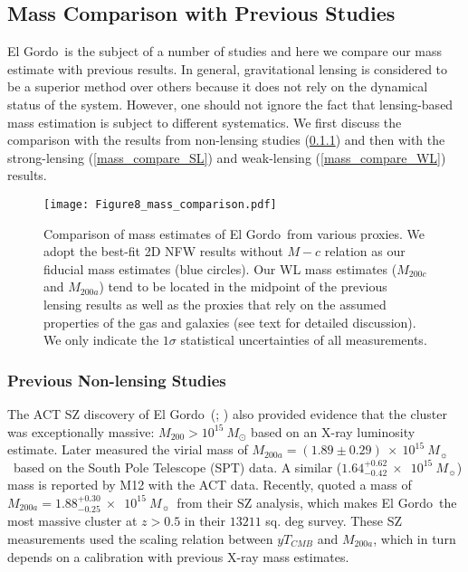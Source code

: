 \documentclass[twocolumn]{aastex631}
\newcommand{\elgordo}{El Gordo}
\newcommand{\solarmA}{$10^{15}~M_{\sun}$}
\begin{document}
\subsection{Mass Comparison with Previous Studies}
\elgordo~is the subject of a number of studies and here we compare our mass estimate with previous results. 
In general, gravitational lensing is considered to be a superior method over others because it does not rely on the dynamical status of the system. 
However, one should not ignore the fact that lensing-based mass estimation is subject to different systematics. 
We first discuss the comparison with the results from non-lensing studies (\textsection\ref{mass_comparison_non_lensing}) and then with the strong-lensing (\textsection\ref{mass_compare_SL}) and weak-lensing (\textsection\ref{mass_compare_WL}) results.



\begin{figure}
\centering
\texttt{[image: Figure8\_mass\_comparison.pdf]}
\caption{Comparison of mass estimates of \elgordo~from various proxies. 
We adopt the best-fit 2D NFW results without $M-c$ relation as our fiducial mass estimates (blue circles). Our WL mass estimates ($M_{200c}$ and $M_{200a}$) tend to be located in the midpoint of the previous lensing results as well as the proxies that rely on the assumed properties of the gas and galaxies (see text for detailed discussion). We only indicate the $1\sigma$ statistical uncertainties of all measurements.}
\label{fig:mass_compare}
\end{figure}



\subsubsection{Previous Non-lensing Studies} \label{mass_comparison_non_lensing}
The ACT SZ discovery of \elgordo~(\citealt{Menanteau2010}; \citealt{Marriage2011}) also provided evidence that the cluster was exceptionally massive: $M_{200} > 10^{15}\ M_\odot$ based on an X-ray luminosity estimate. 
Later \cite{Williamson2011} measured the virial mass of $M_{200a} = (1.89\pm0.29)~\times~$\solarmA~based on the South Pole Telescope (SPT) data. A similar ($1.64^{+0.62}_{-0.42}~\times$~\solarmA) mass is reported by M12 with the ACT data. 
Recently, \cite{Hilton2021} quoted a mass of $M_{200a} = 1.88^{+0.30}_{-0.25}~\times$~\solarmA~from their SZ analysis, which makes \elgordo~the most massive cluster at $z > 0.5$ in their $13211$ sq. deg survey. 
These SZ measurements used the scaling relation between $yT_{CMB}$ and $M_{200a}$, which in turn depends on a calibration with previous X-ray mass estimates.
\end{document}
